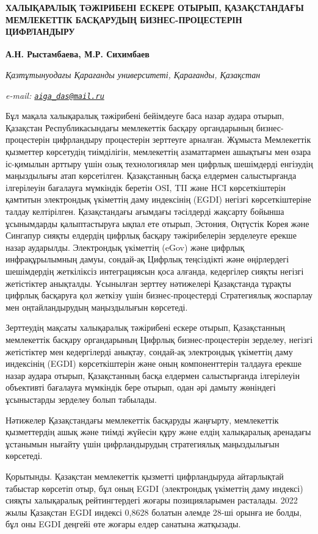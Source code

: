 {{\bfseries ХАЛЫҚАРАЛЫҚ ТӘЖІРИБЕНІ ЕСКЕРЕ ОТЫРЫП, ҚАЗАҚСТАНДАҒЫ МЕМЛЕКЕТТІК
БАСҚАРУДЫҢ БИЗНЕС-ПРОЦЕСТЕРІН ЦИФРЛАНДЫРУ}

{\bfseries А.Н. Рыстамбаева\textsuperscript{\envelope }, М.Р. Сихимбаев}

\emph{Қазтұтынуодағы Қарағанды университеті, Қарағанды, Қазақстан}

\emph{e-mail:
\href{mailto:aiga_das@mail.ru}{\nolinkurl{aiga\_das@mail.ru}}}

Бұл мақала халықаралық тәжірибені бейімдеуге баса назар аудара отырып,
Қазақстан Республикасындағы мемлекеттік басқару органдарының
бизнес-процестерін цифрландыру процестерін зерттеуге арналған. Жұмыста
Мемлекеттік қызметтер көрсетудің тиімділігін, мемлекеттің азаматтармен
ашықтығы мен өзара іс-қимылын арттыру үшін озық технологиялар мен
цифрлық шешімдерді енгізудің маңыздылығы атап көрсетілген. Қазақстанның
басқа елдермен салыстырғанда ілгерілеуін бағалауға мүмкіндік беретін
OSI, TII және HCI көрсеткіштерін қамтитын электрондық үкіметтің даму
индексінің (EGDI) негізгі көрсеткіштеріне талдау келтірілген.
Қазақстандағы ағымдағы тәсілдерді жақсарту бойынша ұсынымдарды
қалыптастыруға ықпал ете отырып, Эстония, Оңтүстік Корея және Сингапур
сияқты елдердің цифрлық басқару тәжірибелерін зерделеуге ерекше назар
аударылды. Электрондық үкіметтің (eGov) және цифрлық инфрақұрылымның
дамуы, сондай-ақ Цифрлық теңсіздікті және өңірлердегі шешімдердің
жеткіліксіз интеграциясын қоса алғанда, кедергілер сияқты негізгі
жетістіктер анықталды. Ұсынылған зерттеу нәтижелері Қазақстанда тұрақты
цифрлық басқаруға қол жеткізу үшін бизнес-процестерді Стратегиялық
жоспарлау мен оңтайландырудың маңыздылығын көрсетеді.

Зерттеудің мақсаты халықаралық тәжірибені ескере отырып, Қазақстанның
мемлекеттік басқару органдарының Цифрлық бизнес-процестерін зерделеу,
негізгі жетістіктер мен кедергілерді анықтау, сондай-ақ электрондық
үкіметтің даму индексінің (EGDI) көрсеткіштерін және оның компоненттерін
талдауға ерекше назар аудара отырып, Қазақстанның басқа елдермен
салыстырғанда ілгерілеуін объективті бағалауға мүмкіндік бере отырып,
одан әрі дамыту жөніндегі ұсыныстарды зерделеу болып табылады.

Нәтижелер Қазақстандағы мемлекеттік басқаруды жаңғырту, мемлекеттік
қызметтердің ашық және тиімді жүйесін құру және елдің халықаралық
аренадағы ұстанымын нығайту үшін цифрландырудың стратегиялық
маңыздылығын көрсетеді.

Қорытынды. Қазақстан мемлекеттік қызметті цифрландыруда айтарлықтай
табыстар көрсетіп отыр, бұл оның EGDI (электрондық үкіметтің даму
индексі) сияқты халықаралық рейтингтердегі жоғары позицияларымен
расталады. 2022 жылы Қазақстан EGDI индексі 0,8628 болатын әлемде 28-ші
орынға ие болды, бұл оны EGDI деңгейі өте жоғары елдер санатына
жатқызады.

}

